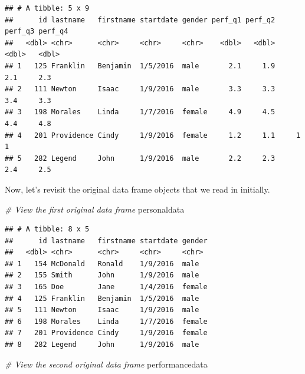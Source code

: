 \documentclass[]{book}
\newenvironment{Shaded}{\begin{snugshade}}{\end{snugshade}}
\newcommand{\KeywordTok}[1]{\textcolor[rgb]{0.13,0.29,0.53}{\textbf{#1}}}
\newcommand{\DataTypeTok}[1]{\textcolor[rgb]{0.13,0.29,0.53}{#1}}
\newcommand{\StringTok}[1]{\textcolor[rgb]{0.31,0.60,0.02}{#1}}
\newcommand{\CommentTok}[1]{\textcolor[rgb]{0.56,0.35,0.01}{\textit{#1}}}
\newcommand{\OperatorTok}[1]{\textcolor[rgb]{0.81,0.36,0.00}{\textbf{#1}}}
\newcommand{\NormalTok}[1]{#1}
\begin{document}
\begin{Shaded}
\end{Shaded}

\begin{verbatim}
## # A tibble: 5 x 9
##      id lastname   firstname startdate gender perf_q1 perf_q2 perf_q3 perf_q4
##   <dbl> <chr>      <chr>     <chr>     <chr>    <dbl>   <dbl>   <dbl>   <dbl>
## 1   125 Franklin   Benjamin  1/5/2016  male       2.1     1.9     2.1     2.3
## 2   111 Newton     Isaac     1/9/2016  male       3.3     3.3     3.4     3.3
## 3   198 Morales    Linda     1/7/2016  female     4.9     4.5     4.4     4.8
## 4   201 Providence Cindy     1/9/2016  female     1.2     1.1     1       1  
## 5   282 Legend     John      1/9/2016  male       2.2     2.3     2.4     2.5
\end{verbatim}

Now, let's revisit the original data frame objects that we read in
initially.

\begin{Shaded}
\begin{Highlighting}[]
\CommentTok{# View the first original data frame}
\NormalTok{personaldata}
\end{Highlighting}
\end{Shaded}

\begin{verbatim}
## # A tibble: 8 x 5
##      id lastname   firstname startdate gender
##   <dbl> <chr>      <chr>     <chr>     <chr> 
## 1   154 McDonald   Ronald    1/9/2016  male  
## 2   155 Smith      John      1/9/2016  male  
## 3   165 Doe        Jane      1/4/2016  female
## 4   125 Franklin   Benjamin  1/5/2016  male  
## 5   111 Newton     Isaac     1/9/2016  male  
## 6   198 Morales    Linda     1/7/2016  female
## 7   201 Providence Cindy     1/9/2016  female
## 8   282 Legend     John      1/9/2016  male
\end{verbatim}

\begin{Shaded}
\begin{Highlighting}[]
\CommentTok{# View the second original data frame}
\NormalTok{performancedata}
\end{Highlighting}
\end{Shaded}
\end{document}
